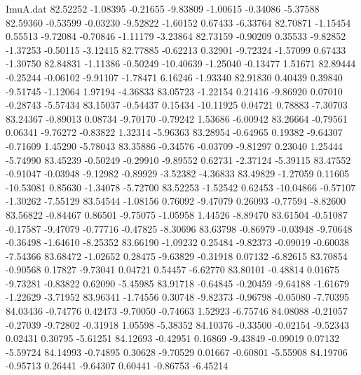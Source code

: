 \begin{filecontents}{ImuA.dat}
  82.52252   -1.08395   -0.21655   -9.83809   -1.00615   -0.34086   -5.37588
  82.59360   -0.53599   -0.03230   -9.52822   -1.60152    0.67433   -6.33764
  82.70871   -1.15454    0.55513   -9.72084   -0.70846   -1.11179   -3.23864
  82.73159   -0.90209    0.35533   -9.82852   -1.37253   -0.50115   -3.12415
  82.77885   -0.62213    0.32901   -9.72324   -1.57099    0.67433   -1.30750
  82.84831   -1.11386   -0.50249  -10.40639   -1.25040   -0.13477    1.51671
  82.89444   -0.25244   -0.06102   -9.91107   -1.78471    6.16246   -1.93340
  82.91830    0.40439    0.39840   -9.51745   -1.12064    1.97194   -4.36833
  83.05723   -1.22154    0.21416   -9.86920    0.07010   -0.28743   -5.57434
  83.15037   -0.54437    0.15434  -10.11925    0.04721    0.78883   -7.30703
  83.24367   -0.89013    0.08734   -9.70170   -0.79242    1.53686   -6.00942
  83.26664   -0.79561    0.06341   -9.76272   -0.83822    1.32314   -5.96363
  83.28954   -0.64965    0.19382   -9.64307   -0.71609    1.45290   -5.78043
  83.35886   -0.34576   -0.03709   -9.81297    0.23040    1.25444   -5.74990
  83.45239   -0.50249   -0.29910   -9.89552    0.62731   -2.37124   -5.39115
  83.47552   -0.91047   -0.03948   -9.12982   -0.89929   -3.52382   -4.36833
  83.49829   -1.27059    0.11605  -10.53081    0.85630   -1.34078   -5.72700
  83.52253   -1.52542    0.62453  -10.04866   -0.57107   -1.30262   -7.55129
  83.54544   -1.08156    0.76092   -9.47079    0.26093   -0.77594   -8.82600
  83.56822   -0.84467    0.86501   -9.75075   -1.05958    1.44526   -8.89470
  83.61504   -0.51087   -0.17587   -9.47079   -0.77716   -0.47825   -8.30696
  83.63798   -0.86979   -0.03948   -9.70648   -0.36498   -1.64610   -8.25352
  83.66190   -1.09232    0.25484   -9.82373   -0.09019   -0.60038   -7.54366
  83.68472   -1.02652    0.28475   -9.63829   -0.31918    0.07132   -6.82615
  83.70854   -0.90568    0.17827   -9.73041    0.04721    0.54457   -6.62770
  83.80101   -0.48814    0.01675   -9.73281   -0.83822    0.62090   -5.45985
  83.91718   -0.64845   -0.20459   -9.64188   -1.61679   -1.22629   -3.71952
  83.96341   -1.74556    0.30748   -9.82373   -0.96798   -0.05080   -7.70395
  84.03436   -0.74776    0.42473   -9.70050   -0.74663    1.52923   -6.75746
  84.08088   -0.21057   -0.27039   -9.72802   -0.31918    1.05598   -5.38352
  84.10376   -0.33500   -0.02154   -9.52343    0.02431    0.30795   -5.61251
  84.12693   -0.42951    0.16869   -9.43849   -0.09019    0.07132   -5.59724
  84.14993   -0.74895    0.30628   -9.70529    0.01667   -0.60801   -5.55908
  84.19706   -0.95713    0.26441   -9.64307    0.60441   -0.86753   -6.45214

\end{filecontents}
